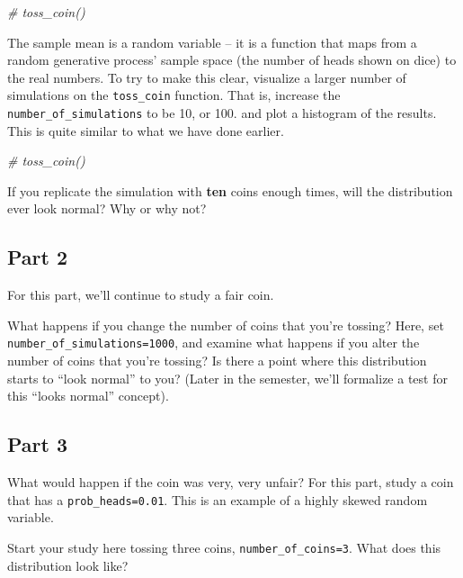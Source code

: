 \documentclass[
]{book}
\newenvironment{Shaded}{\begin{snugshade}}{\end{snugshade}}
\newcommand{\CommentTok}[1]{\textcolor[rgb]{0.56,0.35,0.01}{\textit{#1}}}
\theoremstyle{definition}
\theoremstyle{definition}
\theoremstyle{definition}
\theoremstyle{definition}
\theoremstyle{remark}
\begin{document}
\begin{Shaded}
\begin{Highlighting}[]
\CommentTok{\# toss\_coin()}
\end{Highlighting}
\end{Shaded}

The sample mean is a random variable -- it is a function that maps from a random generative process' sample space (the number of heads shown on dice) to the real numbers. To try to make this clear, visualize a larger number of simulations on the \texttt{toss\_coin} function. That is, increase the \texttt{number\_of\_simulations} to be 10, or 100. and plot a histogram of the results. This is quite similar to what we have done earlier.

\begin{Shaded}
\begin{Highlighting}[]
\CommentTok{\# toss\_coin()}
\end{Highlighting}
\end{Shaded}

If you replicate the simulation with \textbf{ten} coins enough times, will the distribution ever look normal? Why or why not?

\hypertarget{part-2}{%
\subsection{Part 2}\label{part-2}}

For this part, we'll continue to study a fair coin.

What happens if you change the number of coins that you're tossing? Here, set \texttt{number\_of\_simulations=1000}, and examine what happens if you alter the number of coins that you're tossing? Is there a point where this distribution starts to ``look normal'' to you? (Later in the semester, we'll formalize a test for this ``looks normal'' concept).

\hypertarget{part-3}{%
\subsection{Part 3}\label{part-3}}

What would happen if the coin was very, very unfair? For this part, study a coin that has a \texttt{prob\_heads=0.01}. This is an example of a highly skewed random variable.

Start your study here tossing three coins, \texttt{number\_of\_coins=3}. What does this distribution look like?
\end{document}
